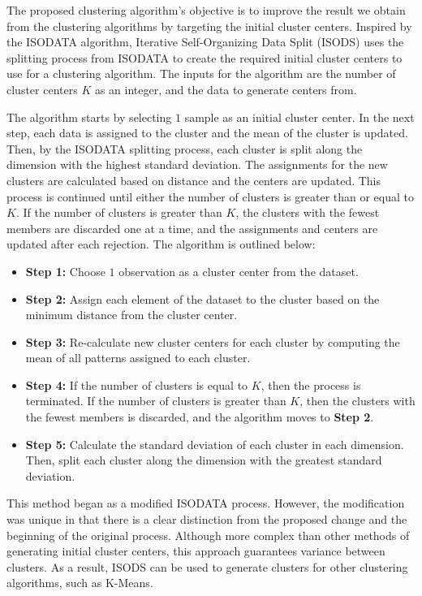 \documentclass[a4paper,10pt]{article}
\begin{document}
The proposed clustering algorithm's objective is to improve the result we obtain
from the clustering algorithms by targeting the initial cluster centers.
Inspired by the ISODATA algorithm, Iterative Self-Organizing Data Split (ISODS)
uses the splitting process from ISODATA to create the required initial cluster
centers to use for a clustering algorithm. The inputs for the algorithm are the
number of cluster centers $K$ as an integer, and the data to generate centers
from. 

The algorithm starts by selecting $1$ sample as an initial cluster center. In
the next step, each data is assigned to the cluster and the mean of the cluster
is updated. Then, by the ISODATA splitting process, each cluster is split along
the dimension with the highest standard deviation. The assignments for the new
clusters are calculated based on distance and the centers are updated. This
process is continued until either the number of clusters is greater than or
equal to $K$. If the number of clusters is greater than $K$, the clusters with
the fewest members are discarded one at a time, and the assignments and centers
are updated after each rejection. The algorithm is outlined below:

\begin{itemize}
      \item \textbf{Step 1:} Choose $1$ observation as a cluster center from the
            dataset.
      \item \textbf{Step 2:} Assign each element of the dataset to the cluster
            based on the minimum distance from the cluster center.
      \item \textbf{Step 3:} Re-calculate new cluster centers for each cluster
            by computing the mean of all patterns assigned to each cluster.
      \item \textbf{Step 4:} If the number of clusters is equal to $K$, then the
            process is terminated. If the number of clusters is greater than
            $K$, then the clusters with the fewest members is discarded, and the
            algorithm moves to \textbf{Step 2}.
      \item \textbf{Step 5:} Calculate the standard deviation of each cluster in
            each dimension. Then, split each cluster along the dimension with
            the greatest standard deviation.
\end{itemize}

This method began as a modified ISODATA process. However, the modification was
unique in that there is a clear distinction from the proposed change and the
beginning of the original process. Although more complex than other methods of
generating initial cluster centers, this approach guarantees variance between
clusters. As a result, ISODS can be used to generate clusters for other
clustering algorithms, such as K-Means.
\end{document}
